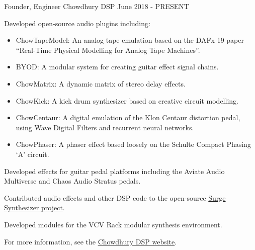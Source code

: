 

\begin{cventries}

  \cventry
    {Founder, Engineer} %
    {Chowdhury DSP} %
    {} %
    {June 2018 - PRESENT} %
    {
      \begin{cvitems} %
        \item {Developed open-source audio plugins including:}
        \begin{itemize}
            \item {ChowTapeModel: An analog tape emulation based on the DAFx-19 paper ``Real-Time Physical Modelling for Analog Tape Machines''.}
            \item {BYOD: A modular system for creating guitar effect signal chains.}
            \item {ChowMatrix: A dynamic matrix of stereo delay effects.}
            \item {ChowKick: A kick drum synthesizer based on creative circuit modelling.}
            \item {ChowCentaur: A digital emulation of the Klon Centaur distortion pedal, using Wave Digital Filters and recurrent neural networks.}
            \item {ChowPhaser: A phaser effect based loosely on the Schulte Compact Phasing `A' circuit.}
        \end{itemize}
        \item {Developed effects for guitar pedal platforms including the Aviate Audio Multiverse and Chaos Audio Stratus pedals.}
        \item {Contributed audio effects and other DSP code to the open-source \href{https://surge-synthesizer.github.io}{Surge Synthesizer project}.}
        \item {Developed modules for the VCV Rack modular synthesis environment.}
        \item {For more information, see the \href{https://chowdsp.com}{Chowdhury DSP website}.}
      \end{cvitems}
    }


\end{cventries}
